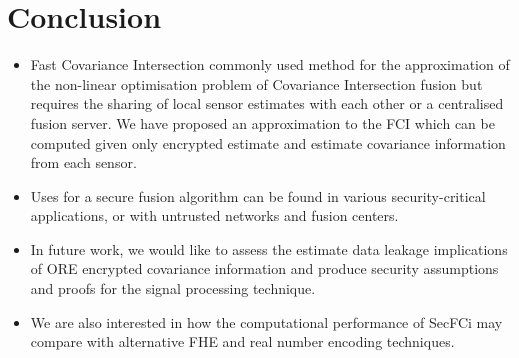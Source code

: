\documentclass[letterpaper, 10 pt, conference]{ieeeconf}  %
\begin{document}
\section{Conclusion} \label{sec:conclusion}
\begin{itemize}
   \item Fast Covariance Intersection commonly used method for the approximation of the non-linear optimisation problem of Covariance Intersection fusion but requires the sharing of local sensor estimates with each other or a centralised fusion server. We have proposed an approximation to the FCI which can be computed given only encrypted estimate and estimate covariance information from each sensor.
   \item Uses for a secure fusion algorithm can be found in various security-critical applications, or with untrusted networks and fusion centers.
   \item In future work, we would like to assess the estimate data leakage implications of ORE encrypted covariance information and produce security assumptions and proofs for the signal processing technique.
   \item We are also interested in how the computational performance of SecFCi may compare with alternative FHE and real number encoding techniques.
\end{itemize}



\end{document}
